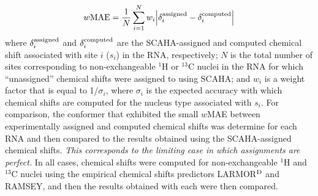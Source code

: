 \documentclass[journal=jcisd8,manuscript=article,layout=onecolumn]{achemso}
\begin{document}
\begin{equation}\label{eq:wmae} 
w{\rm MAE} =  \frac{1}{N} \sum_{i=1}^{N} w_{i} \Big{|} \delta_{i}^{\rm assigned} - \delta_{i}^{\rm computed}\Big{|}
\end{equation}
where $\delta_{i}^{\rm assigned}$ and $\delta_{i}^{\rm computed}$ are the SCAHA-assigned and computed chemical shift associated with site $i$ ($s_{i}$) in the RNA, respectively; $N$ is the total number of sites corresponding to non-exchangeable $^{1}$H or $^{13}$C nuclei in the RNA for which ``unassigned'' chemical shifts were assigned to using SCAHA; and $w_{i}$ is a weight factor that is equal to 1/$\sigma_{i}$, where $\sigma_{i}$ is the expected accuracy with which chemical shifts are computed for the nucleus type associated with $s_{i}$\cite{frank2016can}. For comparison, the conformer that exhibited the small $w$MAE between experimentally assigned and computed chemical shifts was determine for each RNA and then compared to the results obtained using the SCAHA-assigned chemical shifts. \textit{This corresponds to the limiting case in which assignments are perfect.} In all cases, chemical shifts were computed for non-exchangeable $^{1}$H and $^{13}$C nuclei using the empirical chemical shifts predictors LARMOR$^{\rm D}$ and RAMSEY, and then the results obtained with each were then compared.
\end{document}
